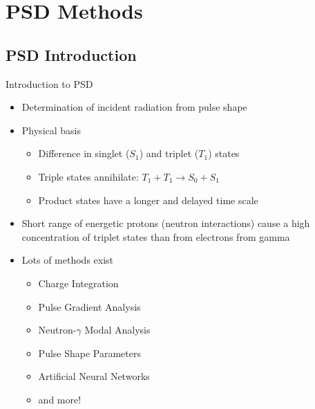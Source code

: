 
% 
%
\section{PSD Methods}


\subsection{PSD Introduction}
\begin{frame}{Introduction to PSD}
	\begin{itemize}
		\small
		\item Determination of incident radiation from pulse shape
		\item Physical basis
		\begin{itemize}
			\tiny
			\item Difference in singlet ($S_1$) and triplet ($T_1$) states \cite{zaitseva_plastic_2012}
			\item Triple states annihilate: $T_1 + T_1 \to S_0 + S_1$
			\item Product states have a longer and delayed time scale
		\end{itemize}
		\small
		\item Short range of energetic protons (neutron interactions) cause a high concentration of triplet states than from electrons from gamma
		\item Lots of methods exist \cite{ambers_hybrid_2011, gamage_comparison_2011, miller_digital_2007}
		\begin{itemize}
			\tiny
			\item Charge Integration
			\item Pulse Gradient Analysis
			\item Neutron-$\gamma$ Modal Analysis
			\item Pulse Shape Parameters
			\item Artificial Neural Networks
			\item and more!
		\end{itemize}
	\end{itemize}
\end{frame}
